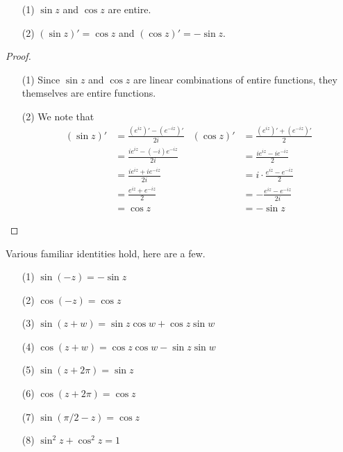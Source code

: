 \medskip

\begin{proposition}\hfill
\begin{itemize}
\item[(1)] $\sin z$ and $\cos z$ are entire.
\item[(2)] $(\sin z)' = \cos z$ and $(\cos z)' = -\sin z$.
\end{itemize}
\end{proposition}
\begin{proof}\hfill
\begin{itemize}
\item[(1)] Since $\sin z$ and $\cos z$ are linear combinations of entire functions, they themselves are entire functions.
\item[(2)] We note that
\begin{align*}
(\sin z)' &= \frac{(e^{iz})' - (e^{-iz})'}{2i} & (\cos z)' &= \frac{(e^{iz})' + (e^{-iz})'}{2}\\[0.5em]
 &= \frac{ie^{iz} -(-i) e^{-iz}}{2i} &  &= \frac{ie^{iz} - ie^{-iz}}{2}\\[0.5em]
 &= \frac{ie^{iz} + ie^{-iz}}{2i} &  &= i\cdot\frac{e^{iz} - e^{-iz}}{2}\\[0.5em]
 &= \frac{e^{iz} + e^{-iz}}{2} &  &= -\frac{e^{iz} - e^{-iz}}{2i}\\[0.5em]
 &= \cos z &  &= -\sin z
\end{align*}
\end{itemize}
\vspace*{-\baselineskip}
\end{proof}

\medskip

\begin{discussion}\label{trigid}
Various familiar identities hold, here are a few.
\begin{multicols}{2}
\begin{itemize}
\item[(1)] $\sin (-z) = -\sin z$
\item[(2)] $\cos(-z) = \cos z$
\item[(3)] $\sin (z+w) = \sin z \cos w + \cos z\sin w$
\item[(4)] $\cos (z+w) = \cos z \cos w - \sin z\sin w$
\item[(5)] $\sin (z+2\pi) = \sin z$
\item[(6)] $\cos (z+ 2\pi) = \cos z$
\item[(7)] $\sin (\pi/2 - z) = \cos z$
\item[(8)] $\sin^2z + \cos^2z = 1$
\end{itemize}
\end{multicols}
\end{discussion}

